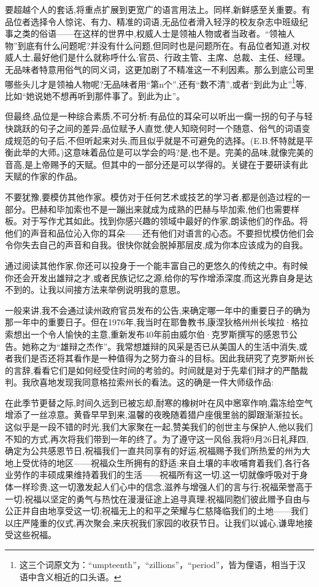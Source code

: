 要超越个人的套话,将重点扩展到更宽广的语言用法上。同样,新鲜感至关重要。有品位者选择令人惊诧、有力、精准的词语,无品位者滑入轻浮的校友杂志中班级纪事之类的俗语——在这样的世界中,权威人士是领袖人物或者当政者。“领袖人物”到底有什么问题呢?并没有什么问题,但同时也是问题所在。有品位者知道,对权威人士,最好他们是什么就称呼什么:官员、行政主管、主席、总裁、主任、经理。无品味者特意用俗气的同义词，这更加剧了不精准这一不利因素。那么到底公司里哪些头儿才是领袖人物呢?无品味者用“第n个”,还有“数不清”,或者“到此为止”\footnote{这三个词原文为：“umpteenth”，“zillions”，“period”，皆为俚语，相当于汉语中含义相近的口头语。}等,比如“她说她不想再听到那件事了。到此为止”。

但最终,品位是一种综合素质,不可分析:有品位的耳朵可以听出一瘸一拐的句子与轻快跳跃的句子之间的差异;品位赋予人直觉,使人知晓何时一个随意、俗气的词语变成规范的句子后,不但听起来对头,而且似乎就是不可避免的选择。(E.B.怀特就是平衡此举的大师。)这意味着品位是可以学会的吗?是,也不是。完美的品味,就像完美的音高,是上帝赐予的天赋。但其中的一部分还是可以学得的。关键在于要研读有此天赋的作家的作品。

不要犹豫,要模仿其他作家。模仿对于任何艺术或技艺的学习者,都是创造过程的一部分。巴赫和毕加索也不是一蹦出来就成为成熟的巴赫与毕加索,他们也需要样板。对于写作尤其如此。找到你感兴趣的领域中最好的作家,朗读他们的作品。将他们的声音和品位沁入你的耳朵——还有他们对语言的心态。不要担忧模仿他们会令你失去自己的声音和自我。很快你就会脱掉那层皮,成为你本应该成为的自我。

通过阅读其他作家,你还可以投身于一个能丰富自己的更悠久的传统之中。有时候你还会开发出雄辩之才,或者民族记忆之源,给你的写作增添深度,而这光靠自身是达不到的。让我以间接方法来举例说明我的意思。

一般来讲,我不会通过读州政府官员发布的公告,来确定哪一年中的重要日子的确为那一年中的重要日子。但在1976年,我当时在耶鲁教书,康涅狄格州州长埃拉·格拉索想出一个令人愉快的主意,重新发布40年前由威尔伯·克罗斯撰写的感恩节公告。她称之为“雄辩之杰作”。我常想雄辩的风采是否已从美国人的生活中消失,或者我们是否还将其看作是一种值得为之努力奋斗的目标。因此我研究了克罗斯州长的言辞,看看它们是如何经受住时间的考验的。时间就是对于先辈们辩才的严酷裁判。我欣喜地发现我同意格拉索州长的看法。这的确是一件大师级作品:

在此季节更替之际,时间久远到已被忘却,耐寒的橡树叶在风中窸窣作响,霜冻给空气增添了一丝凉意。黄昏早早到来,温馨的夜晚随着猎户座俄里翁的脚跟渐渐拉长。这似乎是一段不错的时光,我们大家聚在一起,赞美我们的创世主与保护人,他以我们不知的方式,再次将我们带到一年的终了。为了遵守这一风俗,我将9月26日礼拜四,确定为公共感恩节日,祝福我们一直共同享有的好运,祝福赐予我们所热爱的州为大地上受优待的地区——祝福众生所拥有的舒适:来自土壤的丰收哺育着我们,各行各业劳作的丰硕成果维持着我们的生活——祝福所有这一切,这一切就像呼吸对于身体一样珍贵,这一切激发起人们心中的信念,滋养与增强人们的言与行;祝福荣誉高于一切;祝福以坚定的勇气与热忱在漫漫征途上追寻真理;祝福同胞们彼此赠予自由与公正并自由地享受这一切;祝福无上的和平之荣耀与仁慈降临我们的土地——我们以庄严隆重的仪式,再次聚会,来庆祝我们家园的收获节日。让我们以诚心,谦卑地接受这些祝福。


